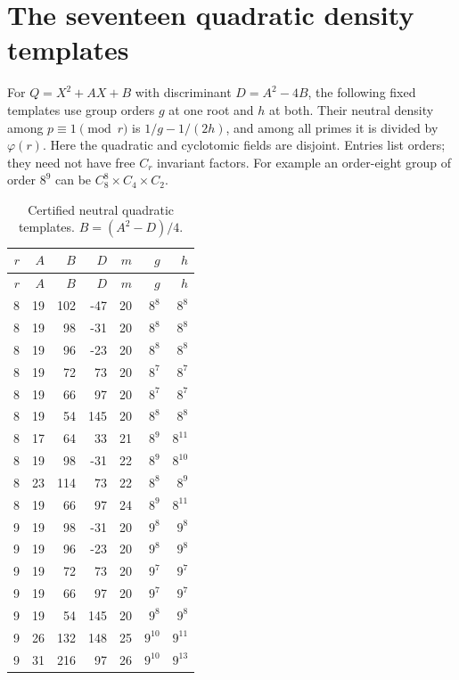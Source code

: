 \documentclass[11pt]{article}
\theoremstyle{definition}\newtheorem{definition}[theorem]{Definition}
\begin{document}
\section{The seventeen quadratic density templates}\label{app:quadratics}
For $Q=X^2+AX+B$ with discriminant $D=A^2-4B$, the following
fixed templates use group orders $g$ at one root and $h$ at both.
Their neutral density among $p\equiv1\pmod r$ is
$1/g-1/(2h)$, and among all primes it is divided by
$\varphi(r)$. Here the quadratic and cyclotomic fields are
disjoint. Entries list orders; they need not have free
$C_r$ invariant factors. For example an order-eight group of
order $8^9$ can be $C_8^8\times C_4\times C_2$.
\begin{center}\small\setlength{\tabcolsep}{4pt}
\begin{longtable}{rrrrrrr}
\caption{Certified neutral quadratic templates. $B=(A^2-D)/4$.}\label{tab:quadratics}\\
\toprule
$r$ & $A$ & $B$ & $D$ & $m$ & $g$ & $h$ \\
\midrule\endfirsthead
\toprule
$r$ & $A$ & $B$ & $D$ & $m$ & $g$ & $h$ \\
\midrule\endhead
8 & 19 & 102 & -47 & 20 & $8^{8}$ & $8^{8}$ \\
8 & 19 & 98 & -31 & 20 & $8^{8}$ & $8^{8}$ \\
8 & 19 & 96 & -23 & 20 & $8^{8}$ & $8^{8}$ \\
8 & 19 & 72 & 73 & 20 & $8^{7}$ & $8^{7}$ \\
8 & 19 & 66 & 97 & 20 & $8^{7}$ & $8^{7}$ \\
8 & 19 & 54 & 145 & 20 & $8^{8}$ & $8^{8}$ \\
8 & 17 & 64 & 33 & 21 & $8^{9}$ & $8^{11}$ \\
8 & 19 & 98 & -31 & 22 & $8^{9}$ & $8^{10}$ \\
8 & 23 & 114 & 73 & 22 & $8^{8}$ & $8^{9}$ \\
8 & 19 & 66 & 97 & 24 & $8^{9}$ & $8^{11}$ \\
9 & 19 & 98 & -31 & 20 & $9^{8}$ & $9^{8}$ \\
9 & 19 & 96 & -23 & 20 & $9^{8}$ & $9^{8}$ \\
9 & 19 & 72 & 73 & 20 & $9^{7}$ & $9^{7}$ \\
9 & 19 & 66 & 97 & 20 & $9^{7}$ & $9^{7}$ \\
9 & 19 & 54 & 145 & 20 & $9^{8}$ & $9^{8}$ \\
9 & 26 & 132 & 148 & 25 & $9^{10}$ & $9^{11}$ \\
9 & 31 & 216 & 97 & 26 & $9^{10}$ & $9^{13}$ \\
\bottomrule\end{longtable}\end{center}
\end{document}
